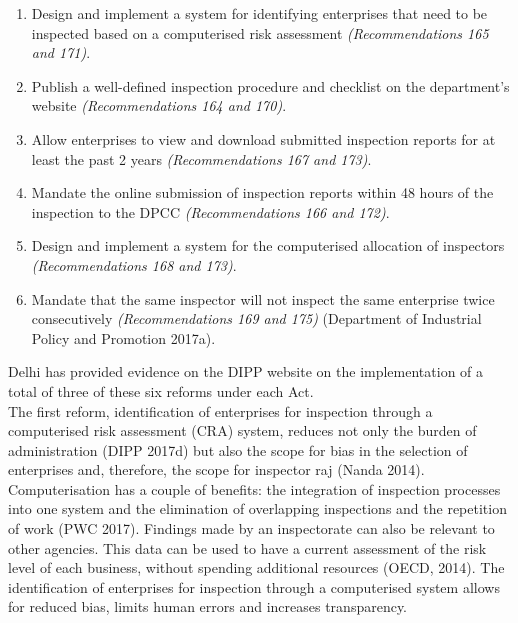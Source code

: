 \documentclass[a4paper, 12pt]{article}
\begin{document}
                 \begin{enumerate}
                 \item Design and implement a system for identifying enterprises that need to be inspected based on a computerised risk assessment \textit{(Recommendations 165 and 171)}.
                 \item Publish a well-defined inspection procedure and checklist on the department’s website \textit{(Recommendations 164 and 170)}.
                 \item Allow enterprises to view and download submitted inspection reports for at least the past 2 years \textit{(Recommendations 167 and 173)}.
                 \item Mandate the online submission of inspection reports within 48 hours of the inspection to the DPCC \textit{(Recommendations 166 and 172)}.
                 \item Design and implement a system for the computerised allocation of inspectors \textit{(Recommendations 168 and 173)}.
                 \item Mandate that the same inspector will not inspect the same enterprise twice consecutively \textit{(Recommendations 169 and 175)} (Department of Industrial Policy and Promotion 2017a).
                 \end{enumerate}
                 
                 Delhi has provided evidence on the DIPP website on the implementation of a total of three of these six reforms under each Act. \\
                 
                 The first reform, identification of enterprises for inspection through a computerised risk assessment (CRA) system, reduces not only the burden of administration (DIPP 2017d) but also the scope for bias in the selection of enterprises and, therefore, the scope for inspector raj (Nanda 2014). \\
                 
                 Computerisation has a couple of benefits: the integration of inspection processes into one system and the elimination of overlapping inspections and the repetition of work (PWC 2017). Findings made by an inspectorate can also be relevant to other agencies. This data can be used to have a current assessment of the risk level of each business, without spending additional resources (OECD, 2014). The identification of enterprises for inspection through a computerised system allows for reduced bias, limits human errors and increases transparency. \\
                 
\end{document}
